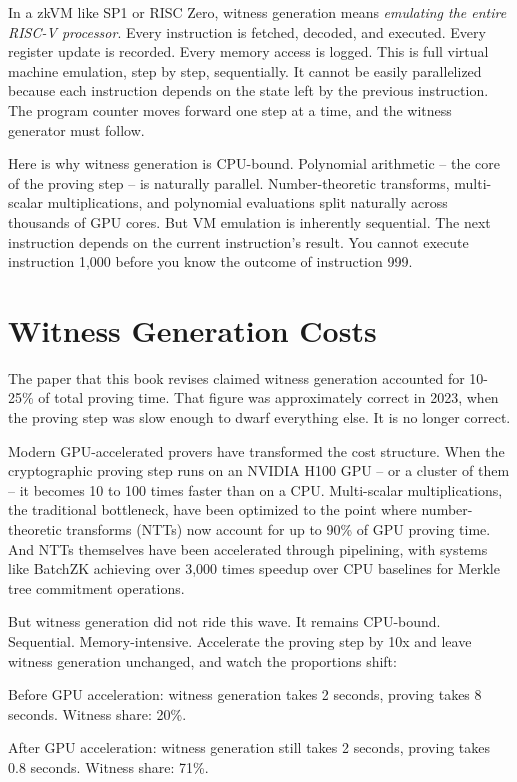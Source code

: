 \documentclass[
  11pt,
  openany]{report}
\begin{document}
In a zkVM like SP1 or RISC Zero, witness generation means \emph{emulating the
entire RISC-V processor}. Every instruction is fetched, decoded, and executed.
Every register update is recorded. Every memory access is logged. This is full
virtual machine emulation, step by step, sequentially. It cannot be easily
parallelized because each instruction depends on the state left by the previous
instruction. The program counter moves forward one step at a time, and the
witness generator must follow.

Here is why witness generation is CPU-bound. Polynomial arithmetic -- the core
of the proving step -- is naturally parallel. Number-theoretic transforms,
multi-scalar multiplications, and polynomial evaluations split naturally across
thousands of GPU cores. But VM emulation is inherently sequential. The next
instruction depends on the current instruction's result. You cannot execute
instruction 1,000 before you know the outcome of instruction 999.

\section{Witness Generation Costs}\label{witness-generation-costs}

The paper that this book revises claimed witness generation accounted for
10-25\% of total proving time. That figure was approximately correct in 2023,
when the proving step was slow enough to dwarf everything else. It is no longer
correct.

Modern GPU-accelerated provers have transformed the cost structure. When the
cryptographic proving step runs on an NVIDIA H100 GPU -- or a cluster of them --
it becomes 10 to 100 times faster than on a CPU. Multi-scalar multiplications,
the traditional bottleneck, have been optimized to the point where
number-theoretic transforms (NTTs) now account for up to 90\% of GPU proving
time. And NTTs themselves have been accelerated through pipelining, with systems
like BatchZK achieving over 3,000 times speedup over CPU baselines for Merkle
tree commitment operations.

But witness generation did not ride this wave. It remains CPU-bound. Sequential.
Memory-intensive. Accelerate the proving step by 10x and leave witness
generation unchanged, and watch the proportions shift:

Before GPU acceleration: witness generation takes 2 seconds, proving takes 8
seconds. Witness share: 20\%.

After GPU acceleration: witness generation still takes 2 seconds, proving takes
0.8 seconds. Witness share: 71\%.
\end{document}
